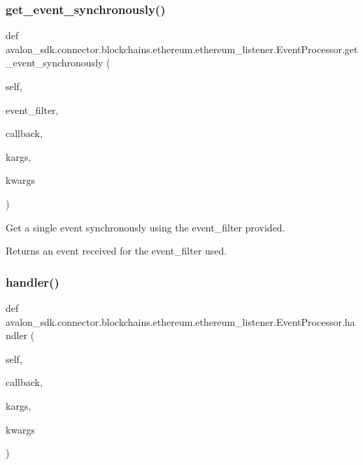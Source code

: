 \subsubsection{\texorpdfstring{get\+\_\+event\+\_\+synchronously()}{get\_event\_synchronously()}}
{\footnotesize\ttfamily def avalon\+\_\+sdk.\+connector.\+blockchains.\+ethereum.\+ethereum\+\_\+listener.\+Event\+Processor.\+get\+\_\+event\+\_\+synchronously (\begin{DoxyParamCaption}\item[{}]{self,  }\item[{}]{event\+\_\+filter,  }\item[{}]{callback,  }\item[{}]{kargs,  }\item[{}]{kwargs }\end{DoxyParamCaption})}

\begin{DoxyVerb}Get a single event synchronously using the event_filter
provided.

Returns an event received for the event_filter used.
\end{DoxyVerb}
 \mbox{\label{classavalon__sdk_1_1connector_1_1blockchains_1_1ethereum_1_1ethereum__listener_1_1EventProcessor_a332ae0d71653f763026ffcca21d21ed9}} 
\subsubsection{\texorpdfstring{handler()}{handler()}}
{\footnotesize\ttfamily def avalon\+\_\+sdk.\+connector.\+blockchains.\+ethereum.\+ethereum\+\_\+listener.\+Event\+Processor.\+handler (\begin{DoxyParamCaption}\item[{}]{self,  }\item[{}]{callback,  }\item[{}]{kargs,  }\item[{}]{kwargs }\end{DoxyParamCaption})}

